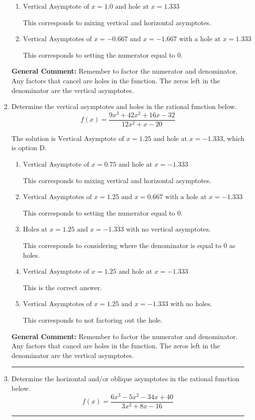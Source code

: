 \documentclass{extbook}[14pt]
\newcommand{\litem}[1]{\item #1

\rule{\textwidth}{0.4pt}}
\begin{document}
\begin{enumerate}
{\begin{enumerate}[label=\Alph*.]
This corresponds to not factoring out the hole.
\item \( \text{Vertical Asymptote of } x = 1.0 \text{ and hole at } x = 1.333 \)

This corresponds to mixing vertical and horizontal asymptotes.
\item \( \text{Vertical Asymptotes of } x = -0.667 \text{ and } x = -1.667 \text{ with a hole at } x = 1.333 \)

This corresponds to setting the numerator equal to 0.
\end{enumerate}

\textbf{General Comment:} Remember to factor the numerator and denominator. Any factors that cancel are holes in the function. The zeros left in the denominator are the vertical asymptotes.
}
\litem{
Determine the vertical asymptotes and holes in the rational function below.
\[ f(x) = \frac{9x^{3} +42 x^{2} +16 x -32}{12x^{2} +x -20} \]

The solution is \( \text{Vertical Asymptote of } x = 1.25 \text{ and hole at } x = -1.333 \), which is option D.\begin{enumerate}[label=\Alph*.]
\item \( \text{Vertical Asymptote of } x = 0.75 \text{ and hole at } x = -1.333 \)

This corresponds to mixing vertical and horizontal asymptotes.
\item \( \text{Vertical Asymptotes of } x = 1.25 \text{ and } x = 0.667 \text{ with a hole at } x = -1.333 \)

This corresponds to setting the numerator equal to 0.
\item \( \text{Holes at } x = 1.25 \text{ and } x = -1.333 \text{ with no vertical asymptotes.} \)

This corresponds to considering where the denominator is equal to 0 as holes.
\item \( \text{Vertical Asymptote of } x = 1.25 \text{ and hole at } x = -1.333 \)

This is the correct answer.
\item \( \text{Vertical Asymptotes of } x = 1.25 \text{ and } x = -1.333 \text{ with no holes.} \)

This corresponds to not factoring out the hole.
\end{enumerate}

\textbf{General Comment:} Remember to factor the numerator and denominator. Any factors that cancel are holes in the function. The zeros left in the denominator are the vertical asymptotes.
}
\litem{
Determine the horizontal and/or oblique asymptotes in the rational function below.
\[ f(x) = \frac{6x^{3} -5 x^{2} -34 x + 40}{3x^{2} +8 x -16} \]

}
\end{enumerate}
\end{document}
